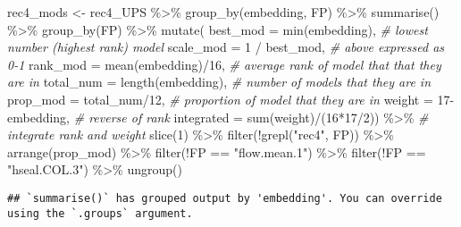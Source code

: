 \documentclass[
]{article}
\newenvironment{Shaded}{\begin{snugshade}}{\end{snugshade}}
\newcommand{\AttributeTok}[1]{\textcolor[rgb]{0.77,0.63,0.00}{#1}}
\newcommand{\CommentTok}[1]{\textcolor[rgb]{0.56,0.35,0.01}{\textit{#1}}}
\newcommand{\DecValTok}[1]{\textcolor[rgb]{0.00,0.00,0.81}{#1}}
\newcommand{\FunctionTok}[1]{\textcolor[rgb]{0.00,0.00,0.00}{#1}}
\newcommand{\NormalTok}[1]{#1}
\newcommand{\OtherTok}[1]{\textcolor[rgb]{0.56,0.35,0.01}{#1}}
\newcommand{\SpecialCharTok}[1]{\textcolor[rgb]{0.00,0.00,0.00}{#1}}
\newcommand{\StringTok}[1]{\textcolor[rgb]{0.31,0.60,0.02}{#1}}
\begin{document}
\begin{Shaded}
\begin{Highlighting}[]
\NormalTok{rec4\_mods }\OtherTok{\textless{}{-}}\NormalTok{ rec4\_UPS }\SpecialCharTok{\%\textgreater{}\%}
  \FunctionTok{group\_by}\NormalTok{(embedding, FP) }\SpecialCharTok{\%\textgreater{}\%} 
  \FunctionTok{summarise}\NormalTok{() }\SpecialCharTok{\%\textgreater{}\%} 
  \FunctionTok{group\_by}\NormalTok{(FP) }\SpecialCharTok{\%\textgreater{}\%} 
  \FunctionTok{mutate}\NormalTok{(}
    \AttributeTok{best\_mod =} \FunctionTok{min}\NormalTok{(embedding), }\CommentTok{\# lowest number (highest rank) model}
    \AttributeTok{scale\_mod =} \DecValTok{1} \SpecialCharTok{/}\NormalTok{ best\_mod, }\CommentTok{\# above expressed as 0{-}1}
    \AttributeTok{rank\_mod =} \FunctionTok{mean}\NormalTok{(embedding)}\SpecialCharTok{/}\DecValTok{16}\NormalTok{, }\CommentTok{\# average rank of model that that they are in}
    \AttributeTok{total\_num =} \FunctionTok{length}\NormalTok{(embedding), }\CommentTok{\# number of models that they are in}
    \AttributeTok{prop\_mod =}\NormalTok{ total\_num}\SpecialCharTok{/}\DecValTok{12}\NormalTok{, }\CommentTok{\# proportion of model that they are in }
    \AttributeTok{weight =} \DecValTok{17}\SpecialCharTok{{-}}\NormalTok{embedding, }\CommentTok{\# reverse of rank}
    \AttributeTok{integrated =} \FunctionTok{sum}\NormalTok{(weight)}\SpecialCharTok{/}\NormalTok{(}\DecValTok{16}\SpecialCharTok{*}\DecValTok{17}\SpecialCharTok{/}\DecValTok{2}\NormalTok{)) }\SpecialCharTok{\%\textgreater{}\%} \CommentTok{\# integrate rank and weight }
  \FunctionTok{slice}\NormalTok{(}\DecValTok{1}\NormalTok{) }\SpecialCharTok{\%\textgreater{}\%} 
  \FunctionTok{filter}\NormalTok{(}\SpecialCharTok{!}\FunctionTok{grepl}\NormalTok{(}\StringTok{"rec4"}\NormalTok{, FP)) }\SpecialCharTok{\%\textgreater{}\%} 
  \FunctionTok{arrange}\NormalTok{(prop\_mod) }\SpecialCharTok{\%\textgreater{}\%} 
  \FunctionTok{filter}\NormalTok{(}\SpecialCharTok{!}\NormalTok{FP }\SpecialCharTok{==} \StringTok{"flow.mean.1"}\NormalTok{) }\SpecialCharTok{\%\textgreater{}\%} 
  \FunctionTok{filter}\NormalTok{(}\SpecialCharTok{!}\NormalTok{FP }\SpecialCharTok{==} \StringTok{"hseal.COL.3"}\NormalTok{) }\SpecialCharTok{\%\textgreater{}\%}
  \FunctionTok{ungroup}\NormalTok{()}
\end{Highlighting}
\end{Shaded}

\begin{verbatim}
## `summarise()` has grouped output by 'embedding'. You can override using the `.groups` argument.
\end{verbatim}
\end{document}
